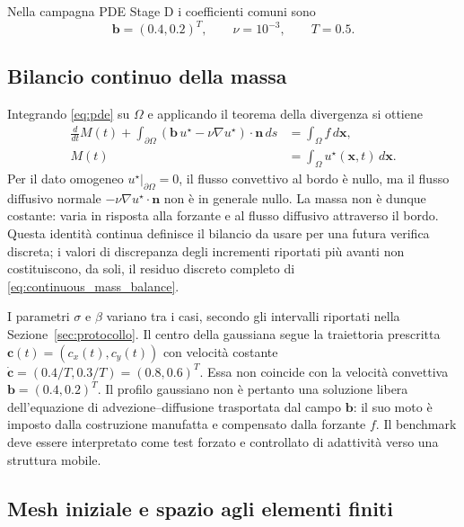 Nella campagna PDE Stage D i coefficienti comuni sono
\begin{equation}
\bm b=(0.4,0.2)^T,\qquad
\nu=10^{-3},\qquad T=0.5.
\label{eq:pde_coefficients}
\end{equation}

\subsection{Bilancio continuo della massa}
Integrando \eqref{eq:pde} su $\Omega$ e applicando il teorema della divergenza si ottiene
\begin{equation}
\begin{aligned}
\frac{d}{dt}M(t)+\int_{\partial\Omega}
(\bm b\,u^\star-\nu\nabla u^\star)\cdot\bm n\,ds
&=\int_\Omega f\,d\bm x,\\
M(t)&=\int_\Omega u^\star(\bm x,t)\,d\bm x.
\end{aligned}
\label{eq:continuous_mass_balance}
\end{equation}
Per il dato omogeneo $u^\star|_{\partial\Omega}=0$, il flusso convettivo al bordo è nullo, ma il flusso diffusivo normale $-\nu\nabla u^\star\cdot\bm n$ non è in generale nullo. La massa non è dunque costante: varia in risposta alla forzante e al flusso diffusivo attraverso il bordo. Questa identità continua definisce il bilancio da usare per una futura verifica discreta; i valori di discrepanza degli incrementi riportati più avanti non costituiscono, da soli, il residuo discreto completo di \eqref{eq:continuous_mass_balance}.

I parametri $\sigma$ e $\beta$ variano tra i casi, secondo gli intervalli riportati nella Sezione~\ref{sec:protocollo}. Il centro della gaussiana segue la traiettoria prescritta $\bm c(t)=(c_x(t),c_y(t))$ con velocità costante $\dot{\bm c}=(0.4/T,0.3/T)=(0.8,0.6)^T$. Essa non coincide con la velocità convettiva $\bm b=(0.4,0.2)^T$. Il profilo gaussiano non è pertanto una soluzione libera dell'equazione di advezione--diffusione trasportata dal campo $\bm b$: il suo moto è imposto dalla costruzione manufatta e compensato dalla forzante $f$. Il benchmark deve essere interpretato come test forzato e controllato di adattività verso una struttura mobile.

\subsection{Mesh iniziale e spazio agli elementi finiti}

